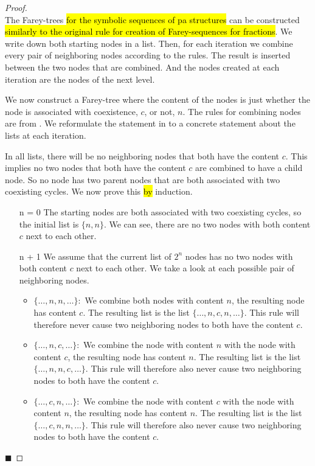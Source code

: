 \begin{proof} \phantom{x} \\
	The Farey-trees \hl{for the symbolic sequences of \gls{pa} structures} can be constructed \hl{similarly to the original rule for creation of Farey-sequences for fractions}.
	We write down both starting nodes in a list.
	Then, for each iteration we combine every pair of neighboring nodes according to the rules.
	The result is inserted between the two nodes that are combined.
	And the nodes created at each iteration are the nodes of the next level.

	We now construct a Farey-tree where the content of the nodes is just whether the node is associated with coexistence, $c$, or not, $n$.
	The rules for combining nodes are from .
	We reformulate the statement in  to a concrete statement about the lists at each iteration.

	In all lists, there will be no neighboring nodes that both have the content $c$.
	This implies no two nodes that both have the content $c$ are combined to have a child node.
	So no node has two parent nodes that are both associated with two coexisting cycles.
	We now prove this \hl{by} induction.

	\begin{itemize}
		\item[n = 0] The starting nodes are both associated with two coexisting cycles, so the initial list is $\{n, n\}$.
			We can see, there are no two nodes with both content $c$ next to each other. \checkmark
		\item[n + 1] We assume that the current list of $2^n$ nodes has no two nodes with both content $c$ next to each other.
			We take a look at each possible pair of neighboring nodes.
			\begin{itemize}
				\item $\{\dots, n, n, \dots\}:$ We combine both nodes with content $n$, the resulting node has content $c$.
				      The resulting list is the list $\{\dots, n, c, n, \dots\}$.
				      This rule will therefore never cause two neighboring nodes to both have the content $c$.
				\item $\{\dots, n, c, \dots\}:$ We combine the node with content $n$ with the node with content $c$, the resulting node has content $n$.
				      The resulting list is the list $\{\dots, n, n, c, \dots\}$.
				      This rule will therefore also never cause two neighboring nodes to both have the content $c$.
				\item $\{\dots, c, n, \dots\}:$ We combine the node with content $c$ with the node with content $n$, the resulting node has content $n$.
				      The resulting list is the list $\{\dots, c, n, n, \dots\}$.
				      This rule will therefore also never cause two neighboring nodes to both have the content $c$.
			\end{itemize}
	\end{itemize}
	\hfill $\blacksquare$
\end{proof}
